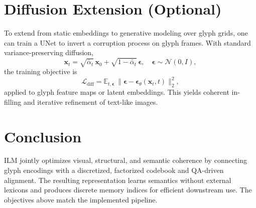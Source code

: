 \documentclass[11pt]{article}
\begin{document}
\section{Diffusion Extension (Optional)}
To extend from static embeddings to generative modeling over glyph grids, one can train a UNet to invert a corruption process on glyph frames. With standard variance-preserving diffusion,
\[
  \mathbf{x}_t = \sqrt{\bar{\alpha}_t}\,\mathbf{x}_0 + \sqrt{1-\bar{\alpha}_t}\,\boldsymbol{\epsilon}, \quad \boldsymbol{\epsilon} \sim \mathcal{N}(0, I),
\]
the training objective is
\[
  \mathcal{L}_{\text{diff}} = \mathbb{E}_{t,\boldsymbol{\epsilon}}\,\big\lVert \boldsymbol{\epsilon} - \boldsymbol{\epsilon}_\theta(\mathbf{x}_t, t) \big\rVert_2^2,
\]
applied to glyph feature maps or latent embeddings. This yields coherent in-filling and iterative refinement of text-like images.

\section{Conclusion}
ILM jointly optimizes visual, structural, and semantic coherence by connecting glyph encodings with a discretized, factorized codebook and QA-driven alignment. The resulting representation learns semantics without external lexicons and produces discrete memory indices for efficient downstream use. The objectives above match the implemented pipeline.
\end{document}
